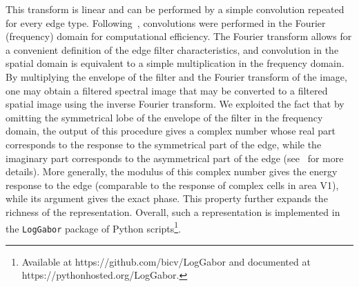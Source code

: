 \documentclass{article}
\newcommand{\url}[1]{{\rm #1}}
\begin{document}
This transform is linear and can be performed by a simple convolution repeated for every edge type. Following~\citep{Fischer07cv}, convolutions were performed in the Fourier (frequency) domain for computational efficiency. The Fourier transform allows for a convenient definition of the edge filter characteristics, and convolution in the spatial domain is equivalent to a simple multiplication in the frequency domain. By multiplying the envelope of the filter and the Fourier transform of the image, one may obtain a filtered spectral image that may be converted to a filtered spatial image using the inverse Fourier transform. We exploited the fact that by omitting the symmetrical lobe of the envelope of the filter in the frequency domain, the output of this procedure gives a complex number whose real part corresponds to the response to the symmetrical part of the edge, while the imaginary part corresponds to the asymmetrical part of the edge (see~\citep{Fischer07cv} for more details). More generally, the modulus of this complex number gives the energy response to the edge (comparable to the response of complex cells in area V1), while its argument gives the exact phase. This property further expands the richness of the representation. Overall, such a representation is implemented in the \verb+LogGabor+ package of Python scripts\footnote{Available at \url{https://github.com/bicv/LogGabor} and documented at \url{https://pythonhosted.org/LogGabor}.}.
\end{document}
